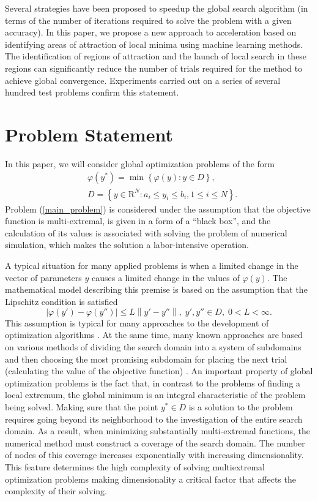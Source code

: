 \documentclass[entropy,article,submit,moreauthors,pdftex]{Definitions/mdpi}
\begin{document}
Several strategies have been proposed to speedup the global search algorithm (in terms of the number of iterations required to solve the problem with a given accuracy). In this paper, we propose a new approach to acceleration based on identifying areas of attraction of local minima using machine learning methods. The identification of regions of attraction and the launch of local search in these regions can significantly reduce the number of trials required for the method to achieve global convergence. Experiments carried out on a series of several hundred test problems confirm this statement. 



\section{Problem Statement}

In this paper, we will consider global optimization problems of the form
\begin{eqnarray}\label{main_problem}
& \varphi(y^\ast)=\min{\left\{\varphi(y):y\in D\right\}},\\
& D=\left\{y\in \text{R}^N: a_i\leq y_i \leq b_i, 1\leq i \leq N\right\}. \nonumber
\end{eqnarray}
Problem (\ref{main_problem}) is considered under the assumption that the objective function is multi-extremal, is given in a form of a ``black box'', and the calculation of its values is associated with solving the problem of numerical simulation, which makes the solution a labor-intensive operation.

A typical situation for many applied problems is when a limited change in the vector of parameters $y$ causes a limited change in the values of $\varphi(y)$. The mathematical model describing this premise is based on the assumption that the Lipschitz condition is satisfied
\[
\left|\varphi(y')-\varphi(y'')\right|\leq L\left\|y'-y''\right\|,\; y',y'' \in D,\; 0<L<\infty.
\]
This assumption is typical for many approaches to the development of optimization algorithms \cite{Jones1993,Pinter1996,Zilinskas2008,Evtushenko2009,Sergeyev2020}.
At the same time, many known approaches are based on various methods of dividing the search domain into a system of subdomains and then choosing the most promising subdomain for placing the next trial (calculating the value of the objective function)  \cite{Jones2009,Zilinskas2010,Evtushenko2013,Kvasov2013,Paulavicius2016,Paulavicius2020}. 
An important property of global optimization problems is the fact that, in contrast to the problems of finding a local extremum, the global minimum is an integral characteristic of the problem being solved. Making sure that the point  $y^*\in D$ is a solution to the problem requires going beyond its neighborhood to the investigation of the entire search domain. As a result, when minimizing substantially multi-extremal functions, the numerical method must construct a coverage of the search domain. The number of nodes of this coverage increases exponentially with increasing dimensionality. 
This feature determines the high complexity of solving multiextremal optimization problems making dimensionality a critical factor that affects the complexity of their solving.
\end{document}
